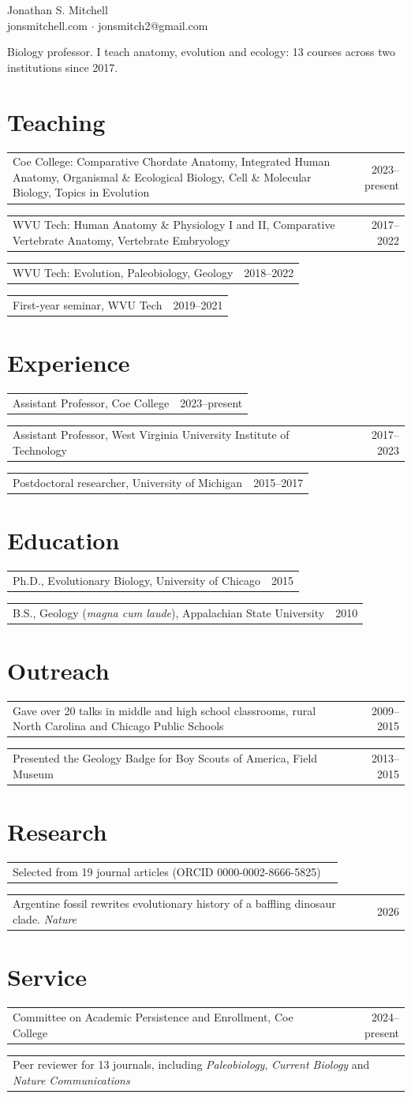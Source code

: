 \documentclass[letterpaper, oneside, 11pt, final]{scrartcl}
\makeatletter
\newcommand{\entry}[2]{%
  \noindent\begin{tabularx}{\linewidth}{@{}X@{\hspace{1em}}r@{}}#1 & #2\end{tabularx}\par\vspace{0.12em}}
\makeatother
\begin{document}
\begin{center}
{\fontsize{30}{30}\selectfont Jonathan S. Mitchell}\\[0.4em]
jonsmitchell.com \quad $\cdot$ \quad jonsmitch2@gmail.com
\end{center}

\vspace{0.5em}
Biology professor. I teach anatomy, evolution and ecology: 13 courses across two institutions since 2017.

\section{Teaching}
\entry{Coe College: Comparative Chordate Anatomy, Integrated Human Anatomy, Organismal \& Ecological Biology, Cell \& Molecular Biology, Topics in Evolution}{2023--present}
\entry{WVU Tech: Human Anatomy \& Physiology I and II, Comparative Vertebrate Anatomy, Vertebrate Embryology}{2017--2022}
\entry{WVU Tech: Evolution, Paleobiology, Geology}{2018--2022}
\entry{First-year seminar, WVU Tech}{2019--2021}

\section{Experience}
\entry{Assistant Professor, Coe College}{2023--present}
\entry{Assistant Professor, West Virginia University Institute of Technology}{2017--2023}
\entry{Postdoctoral researcher, University of Michigan}{2015--2017}

\section{Education}
\entry{Ph.D., Evolutionary Biology, University of Chicago}{2015}
\entry{B.S., Geology (\textit{magna cum laude}), Appalachian State University}{2010}

\section{Outreach}
\entry{Gave over 20 talks in middle and high school classrooms, rural North Carolina and Chicago Public Schools}{2009--2015}
\entry{Presented the Geology Badge for Boy Scouts of America, Field Museum}{2013--2015}

\section{Research}
\entry{Selected from 19 journal articles (ORCID 0000-0002-8666-5825)}{}
\entry{Argentine fossil rewrites evolutionary history of a baffling dinosaur clade. \textit{Nature}}{2026}

\section{Service}
\entry{Committee on Academic Persistence and Enrollment, Coe College}{2024--present}
\entry{Peer reviewer for 13 journals, including \textit{Paleobiology}, \textit{Current Biology} and \textit{Nature Communications}}{}
\end{document}
